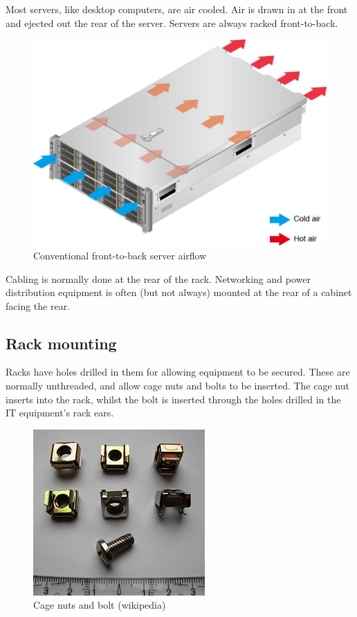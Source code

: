 \documentclass{pgnotes}
\begin{document}
Most servers, like desktop computers, are air cooled.
Air is drawn in at the front and ejected out the rear of the server.
Servers are always racked front-to-back.

\begin{figure}[htbp]
  \centering
  \includegraphics[width=0.5\linewidth]{server_airflow_huawei}
  \caption{Conventional front-to-back server airflow}
  \label{fig:server-airflow}
\end{figure}

Cabling is normally done at the rear of the rack.
Networking and power distribution equipment is often (but not always) mounted at the rear of a cabinet facing the rear.

\subsection{Rack mounting}

Racks have holes drilled in them for allowing equipment to be secured.
These are normally unthreaded, and allow cage nuts and bolts to be inserted.
The cage nut inserts into the rack, whilst the bolt is inserted through the holes drilled in the IT equipment's rack ears.

\begin{figure}[htbp]
  \centering
  \includegraphics[width=0.75\linewidth]{cage_nut}
  \caption{Cage nuts and bolt (wikipedia)}
  \label{fig:cage-nut}
\end{figure}
\end{document}
